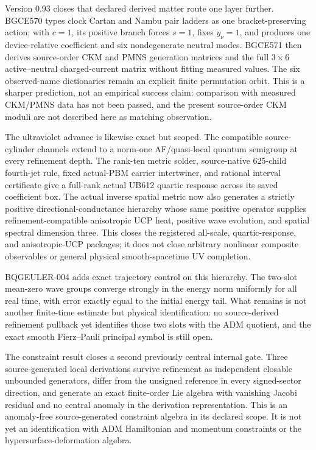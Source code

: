 \documentclass[11pt]{article}
\theoremstyle{definition}
\theoremstyle{remark}
\begin{document}
Version 0.93 closes that declared derived matter route one layer further. BGCE570 types clock Cartan and Nambu pair ladders as one bracket-preserving action; with $c=1$, its positive branch forces $s=1$, fixes $y_\nu=1$, and produces one device-relative coefficient and six nondegenerate neutral modes. BGCE571 then derives source-order CKM and PMNS generation matrices and the full $3\times6$ active--neutral charged-current matrix without fitting measured values. The six observed-name dictionaries remain an explicit finite permutation orbit. This is a sharper prediction, not an empirical success claim: comparison with measured CKM/PMNS data has not been passed, and the present source-order CKM moduli are not described here as matching observation.

The ultraviolet advance is likewise exact but scoped. The compatible source-cylinder channels extend to a norm-one AF/quasi-local quantum semigroup at every refinement depth. The rank-ten metric solder, source-native 625-child fourth-jet rule, fixed actual-PBM carrier intertwiner, and rational interval certificate give a full-rank actual UB612 quartic response across its saved coefficient box. The actual inverse spatial metric now also generates a strictly positive directional-conductance hierarchy whose same positive operator supplies refinement-compatible anisotropic UCP heat, positive wave evolution, and spatial spectral dimension three. This closes the registered all-scale, quartic-response, and anisotropic-UCP packages; it does not close arbitrary nonlinear composite observables or general physical smooth-spacetime UV completion.

BQGEULER-004 adds exact trajectory control on this hierarchy. The two-slot mean-zero wave groups converge strongly in the energy norm uniformly for all real time, with error exactly equal to the initial energy tail. What remains is not another finite-time estimate but physical identification: no source-derived refinement pullback yet identifies those two slots with the ADM quotient, and the exact smooth Fierz--Pauli principal symbol is still open.

The constraint result closes a second previously central internal gate. Three source-generated local derivations survive refinement as independent closable unbounded generators, differ from the unsigned reference in every signed-sector direction, and generate an exact finite-order Lie algebra with vanishing Jacobi residual and no central anomaly in the derivation representation. This is an anomaly-free source-generated constraint algebra in its declared scope. It is not yet an identification with ADM Hamiltonian and momentum constraints or the hypersurface-deformation algebra.
\end{document}
